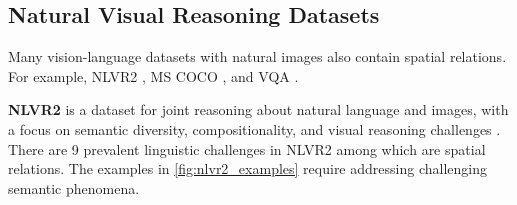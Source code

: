 \subsection{Natural Visual Reasoning Datasets} \label{sec:natural_visual_reasoning_datasets}

Many vision-language datasets with natural images also contain spatial relations. For example, NLVR2 \cite{suhr2018corpus}, MS COCO \cite{lin2014microsoft}, and VQA \cite{antol2015vqa}.

\textbf{NLVR2} is a dataset for joint reasoning about natural language and images, with a focus on semantic diversity, compositionality, and visual reasoning challenges \cite{suhr2018corpus}. There are 9 prevalent linguistic challenges in NLVR2 among which are spatial relations.
The examples in \cref{fig:nlvr2_examples} require addressing challenging semantic phenomena.

